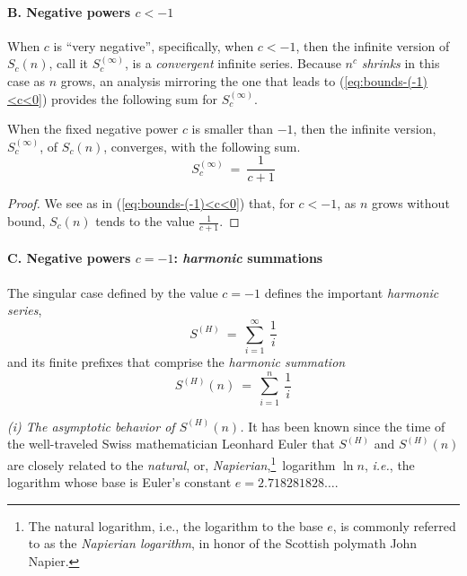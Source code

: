 \paragraph{\small\sf B. Negative powers $c < -1$}

When $c$ is ``very negative'', specifically, when $c < -1$, then the
infinite version of $S_c(n)$, call it $S_c^{(\infty)}$, is a {\em
  convergent} infinite series.  Because $n^c$ {\em shrinks} in this
case as $n$ grows, an analysis mirroring the one that leads to
(\ref{eq:bounds-(-1)<c<0}) provides the following sum for $S_c^{(\infty)}$.

\begin{prop}
\label{thm:bounds-negative-(not-1)-sum-xc}
When the fixed negative power $c$ is smaller than $-1$, then the
infinite version, $S_c^{(\infty)}$, of $S_c(n)$, converges, with the
following sum.
\begin{equation}
\label{eq:bounds-negative-(not-1)-sum-xc}
S_c^{(\infty)} \ = \ \frac{1}{c+1}
\end{equation}
\end{prop}

\begin{proof}
We see as in (\ref{eq:bounds-(-1)<c<0}) that, for $c<-1$, as $n$ grows
without bound, $S_c(n)$ tends to the value ${\displaystyle
  \frac{1}{c+1}}$.
\end{proof}

\paragraph{\small\sf C. Negative powers $c = -1$: {\em harmonic} summations}

The singular case defined by the value $c = -1$ defines the important
{\it harmonic series},
\[ S^{(H)} \ = \ \sum_{i=1}^\infty \ \frac{1}{i} \]
and its finite prefixes that comprise the {\it harmonic summation}
\[ S^{(H)}(n) \ = \ \sum_{i=1}^n \ \frac{1}{i} \]


{\it (i) The asymptotic behavior of $S^{(H)}(n)$.}
%
It has been known since the time of the well-traveled Swiss
mathematician Leonhard Euler  that $S^{(H)}$
and $S^{(H)}(n)$ are closely related to the {\em natural}, or,
{\it Napierian},\footnote{The natural logarithm, i.e., the logarithm
  to the base $e$, is commonly referred to as the {\it Napierian
    logarithm}, in honor of the Scottish polymath John
  Napier.}~logarithm $\ln n$, \textit{i.e.}, the logarithm whose base is
Euler's constant  $e = 2.718281828 \ldots$.

